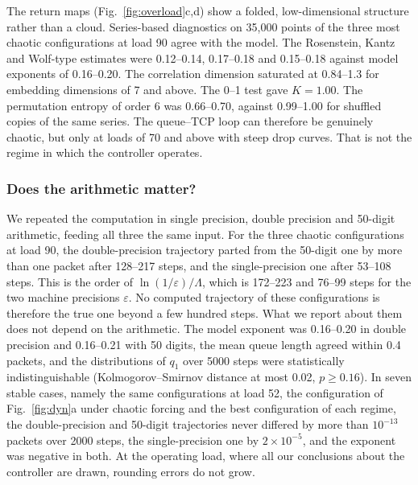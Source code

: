 \documentclass[11pt,a4paper]{article}
\begin{document}
The return maps (Fig.~\ref{fig:overload}c,d) show a folded, low-dimensional structure rather than a cloud. Series-based diagnostics on 35,000 points of the three most chaotic configurations at load 90 agree with the model. The Rosenstein, Kantz and Wolf-type estimates were 0.12--0.14, 0.17--0.18 and 0.15--0.18 against model exponents of 0.16--0.20. The correlation dimension \citep{grassberger1983characterization} saturated at 0.84--1.3 for embedding dimensions of 7 and above. The 0--1 test \citep{gottwald2004new,gottwald2009implementation} gave $K=1.00$. The permutation entropy of order 6 \citep{bandt2002permutation} was 0.66--0.70, against 0.99--1.00 for shuffled copies of the same series. The queue--TCP loop can therefore be genuinely chaotic, but only at loads of 70 and above with steep drop curves. That is not the regime in which the controller operates.

\subsubsection{Does the arithmetic matter?}
\label{sec:precision}
We repeated the computation in single precision, double precision and 50-digit arithmetic, feeding all three the same input. For the three chaotic configurations at load 90, the double-precision trajectory parted from the 50-digit one by more than one packet after 128--217 steps, and the single-precision one after 53--108 steps. This is the order of $\ln(1/\varepsilon)/\Lambda$, which is 172--223 and 76--99 steps for the two machine precisions $\varepsilon$. No computed trajectory of these configurations is therefore the true one beyond a few hundred steps. What we report about them does not depend on the arithmetic. The model exponent was 0.16--0.20 in double precision and 0.16--0.21 with 50 digits, the mean queue length agreed within 0.4 packets, and the distributions of $q_1$ over 5000 steps were statistically indistinguishable (Kolmogorov--Smirnov distance at most 0.02, $p\ge0.16$). In seven stable cases, namely the same configurations at load 52, the configuration of Fig.~\ref{fig:dyn}a under chaotic forcing and the best configuration of each regime, the double-precision and 50-digit trajectories never differed by more than $10^{-13}$ packets over 2000 steps, the single-precision one by $2\times10^{-5}$, and the exponent was negative in both. At the operating load, where all our conclusions about the controller are drawn, rounding errors do not grow.
\end{document}
